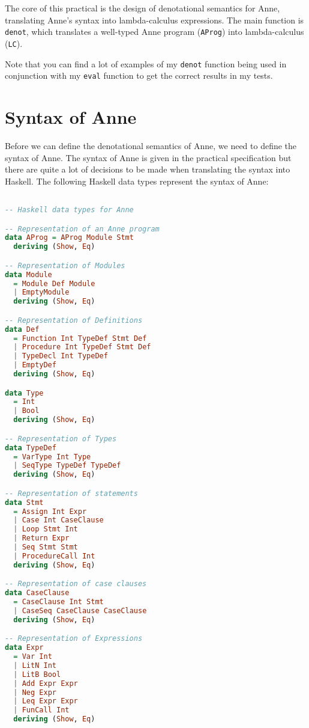 \label{chapter:denotationalsemantics}

The core of this practical is the design of denotational semantics for Anne,
translating Anne's syntax into lambda-calculus expressions. The main function
is \texttt{denot}, which translates a well-typed Anne program (\texttt{AProg}) into lambda-calculus (\texttt{LC}).

Note that you can find a lot of examples of my \texttt{denot} function being used in conjunction
with my \texttt{eval} function to get the correct results in my tests.

\section{Syntax of Anne}

Before we can define the denotational semantics of Anne, we need to define the
syntax of Anne. The syntax of Anne is given in the practical specification but there are
quite a lot of decisions to be made when translating the syntax into Haskell. The
following Haskell data types represent the syntax of Anne:

\begin{lstlisting}[language=Haskell]

-- Haskell data types for Anne

-- Representation of an Anne program
data AProg = AProg Module Stmt
  deriving (Show, Eq)

-- Representation of Modules
data Module
  = Module Def Module
  | EmptyModule
  deriving (Show, Eq)

-- Representation of Definitions
data Def
  = Function Int TypeDef Stmt Def
  | Procedure Int TypeDef Stmt Def
  | TypeDecl Int TypeDef
  | EmptyDef
  deriving (Show, Eq)

data Type
  = Int
  | Bool
  deriving (Show, Eq)

-- Representation of Types
data TypeDef
  = VarType Int Type
  | SeqType TypeDef TypeDef
  deriving (Show, Eq)

-- Representation of statements
data Stmt
  = Assign Int Expr
  | Case Int CaseClause
  | Loop Stmt Int
  | Return Expr
  | Seq Stmt Stmt
  | ProcedureCall Int
  deriving (Show, Eq)

-- Representation of case clauses
data CaseClause
  = CaseClause Int Stmt
  | CaseSeq CaseClause CaseClause
  deriving (Show, Eq)

-- Representation of Expressions
data Expr
  = Var Int
  | LitN Int
  | LitB Bool
  | Add Expr Expr
  | Neg Expr
  | Leq Expr Expr
  | FunCall Int
  deriving (Show, Eq)

\end{lstlisting}

